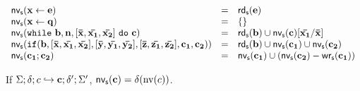 \documentclass[a4paper,11pt]{article}
\begin{document}
\begin{defn}
\[ \]
 \[
 \begin{array}{lll}
     \mathsf{nv_s} (\mathbf{{\mathrel{ x \leftarrow e }}} )  & = & \mathsf{rd_s} (\mathbf{{e}})  \\
     \mathsf{nv_s} ( \mathbf{{ \mathrel{ x \leftarrow q }}} )  & = & \{ \}  \\
     {\mathsf{nv_s} (  \mathtt{while} ~ \mathbf{{b, n, [\bar{x}, \bar{x_1}, \bar{x_2}] ~ \mathtt{do} ~ c}} ) }
     &= & 
     \mathsf{rd_s} (\mathbf{{b}}) \cup \mathsf{nv_s} (\mathbf{{c}})[\mathbf{{ \bar{x_1}}} / \mathbf{{\bar{x}}}]\\
     \mathsf{nv_s} (\mathtt{if}(\mathbf{{b,[\bar{x}, \bar{x_1}, \bar{x_2}],[\bar{y}, \bar{y_1}, \bar{y_2}],[\bar{z}, \bar{z_1}, \bar{z_2}], c_1, c_2}} )) & =& \mathsf{rd_s} (\mathbf{{b}}) \cup \mathsf{nv_s} (\mathbf{{c_1}}) \cup \mathsf{nv_s} (\mathbf{{c_2}})  \\
      \mathsf{nv_s} (\mathbf{{c_1 ; c_2}}) & = & \mathsf{nv_s} (\mathbf{{c_1}}) \cup ( \mathsf{nv_s} (\mathbf{{c_2}}) - \mathsf{wr_s} (\mathbf{{c_1}}))
 \end{array}
 \]
%
\end{defn}
%
%
\begin{lem}
\label{lem:fv}
If $\Sigma;\delta ; c \hookrightarrow \mathbf{{c}} ; \delta';\Sigma' $, $\mathsf{nv_s} (\mathbf{{c}}) = \delta(\text{nv}(c))$. 
\end{lem}
\end{document}
